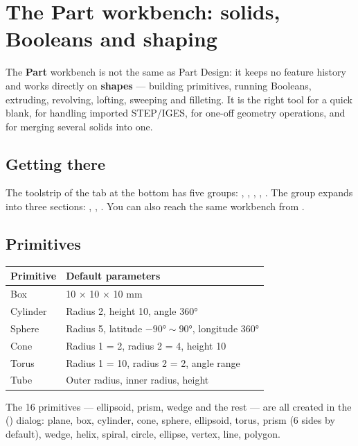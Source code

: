 \chapter{The Part workbench: solids, Booleans and shaping}

The \textbf{Part} workbench is not the same as Part Design: it keeps no feature history and works directly on
\textbf{shapes} --- building primitives, running Booleans, extruding, revolving, lofting, sweeping and filleting. It is the
right tool for a quick blank, for handling imported STEP/IGES, for one-off geometry operations, and for merging several
solids into one.

\section{Getting there}

The toolstrip of the  tab at the bottom has five groups: , , , ,
. The  group expands into three sections: , , . You can also
reach the same workbench from .

\section{Primitives}

\begin{center}
\small
\begin{tabularx}{\linewidth}{@{}lX@{}}
\toprule
\textbf{Primitive} & \textbf{Default parameters} \\
\midrule
Box & 10 × 10 × 10 mm \\
Cylinder & Radius 2, height 10, angle 360° \\
Sphere & Radius 5, latitude $-90°\sim90°$, longitude 360° \\
Cone & Radius 1 = 2, radius 2 = 4, height 10 \\
Torus & Radius 1 = 10, radius 2 = 2, angle range \\
Tube & Outer radius, inner radius, height \\
\bottomrule
\end{tabularx}
\end{center}

The 16 primitives --- ellipsoid, prism, wedge and the rest --- are all created in the 
() dialog: plane, box, cylinder, cone, sphere, ellipsoid, torus, prism (6 sides by default), wedge,
helix, spiral, circle, ellipse, vertex, line, polygon.

